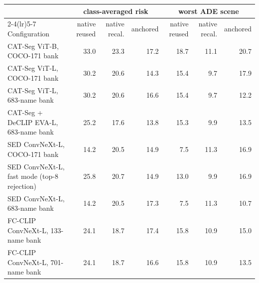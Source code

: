 \begin{tabular}{@{}lrrrrrr@{}}
\toprule
& \multicolumn{3}{c}{class-averaged risk} & \multicolumn{3}{c}{worst ADE scene} \\
\cmidrule(lr){2-4}\cmidrule(lr){5-7}
Configuration & native reused & native recal. & anchored & native reused & native recal. & anchored \\
\midrule
CAT-Seg ViT-B, COCO-171 bank & 33.0 & 23.3 & 17.2 & 18.7 & 11.1 & 20.7 \\
CAT-Seg ViT-L, COCO-171 bank & 30.2 & 20.6 & 14.3 & 15.4 & 9.7 & 17.9 \\
CAT-Seg ViT-L, 683-name bank & 30.2 & 20.6 & 16.6 & 15.4 & 9.7 & 12.2 \\
CAT-Seg + DeCLIP EVA-L, 683-name bank & 25.2 & 17.6 & 13.8 & 15.3 & 9.9 & 13.5 \\
SED ConvNeXt-L, COCO-171 bank & 14.2 & 20.5 & 14.9 & 7.5 & 11.3 & 16.9 \\
SED ConvNeXt-L, fast mode (top-8 rejection) & 25.8 & 20.7 & 14.9 & 13.0 & 9.9 & 16.9 \\
SED ConvNeXt-L, 683-name bank & 14.2 & 20.5 & 17.3 & 7.5 & 11.3 & 10.7 \\
FC-CLIP ConvNeXt-L, 133-name bank & 24.1 & 18.7 & 17.4 & 15.8 & 10.9 & 15.0 \\
FC-CLIP ConvNeXt-L, 701-name bank & 24.1 & 18.7 & 16.6 & 15.8 & 10.9 & 13.5 \\
\bottomrule
\end{tabular}
